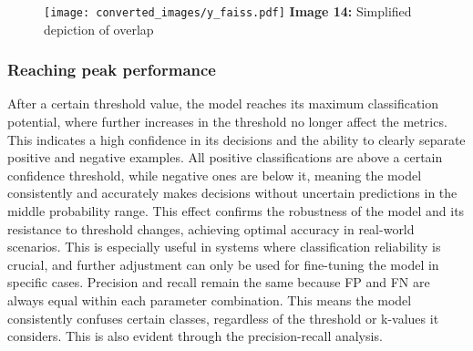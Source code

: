 \documentclass{article}
\begin{document}
\begin{figure}[H]
    \centering
    \texttt{[image: converted\_images/y\_faiss.pdf]}
    \textbf{Image 14:} Simplified depiction of overlap
\end{figure}

\subsubsection*{Reaching peak performance}
\hspace*{1.00cm}After a certain threshold value, the model reaches its maximum classification potential, where further increases in the threshold no longer affect the metrics. This indicates a high confidence in its decisions and the ability to clearly separate positive and negative examples. All positive classifications are above a certain confidence threshold, while negative ones are below it, meaning the model consistently and accurately makes decisions without uncertain predictions in the middle probability range. This effect confirms the robustness of the model and its resistance to threshold changes, achieving optimal accuracy in real-world scenarios. This is especially useful in systems where classification reliability is crucial, and further adjustment can only be used for fine-tuning the model in specific cases.
Precision and recall remain the same because FP and FN are always equal within each parameter combination. This means the model consistently confuses certain classes, regardless of the threshold or k-values it considers. This is also evident through the precision-recall analysis.
\end{document}
